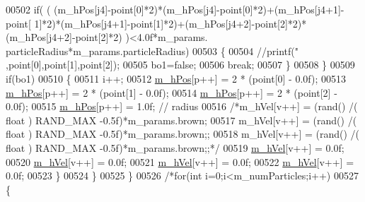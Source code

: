 \begin{DoxyCode}
{{{{{{00502                             \textcolor{keywordflow}{if}( ( (m\_hPos[j4]-point[0]*2)*(m\_hPos[j4]-point[0]*2)+(m\_hPos[j4+1]-point[
      1]*2)*(m\_hPos[j4+1]-point[1]*2)+(m\_hPos[j4+2]-point[2]*2)*(m\_hPos[j4+2]-point[2]*2) )<4.0f*m\_params.
      particleRadius*m\_params.particleRadius)
00503                             \{
00504                                                                 \textcolor{comment}{//printf("%
       ,point[0],point[1],point[2]);}
00505                                 bo1=\textcolor{keyword}{false};
00506                                 \textcolor{keywordflow}{break};
00507                             \}
00508                         \}
00509                         \textcolor{keywordflow}{if}(bo1)
00510                                                 \{
00511                         i++;
00512                         \hyperlink{class_particle_system_ab9d75471d2eaaeb8fa98d2f3f47d9c25}{m\_hPos}[p++] = 2 * (point[0] - 0.0f);
00513                         \hyperlink{class_particle_system_ab9d75471d2eaaeb8fa98d2f3f47d9c25}{m\_hPos}[p++] = 2 * (point[1] - 0.0f);
00514                         \hyperlink{class_particle_system_ab9d75471d2eaaeb8fa98d2f3f47d9c25}{m\_hPos}[p++] = 2 * (point[2] - 0.0f);
00515                         \hyperlink{class_particle_system_ab9d75471d2eaaeb8fa98d2f3f47d9c25}{m\_hPos}[p++] = 1.0f; \textcolor{comment}{// radius}
00516                         \textcolor{comment}{/*m\_hVel[v++] = (rand() /( float ) RAND\_MAX -0.5f)*m\_params.brown;}
00517 \textcolor{comment}{                        m\_hVel[v++] = (rand() /( float ) RAND\_MAX -0.5f)*m\_params.brown;;}
00518 \textcolor{comment}{                        m\_hVel[v++] = (rand() /( float ) RAND\_MAX -0.5f)*m\_params.brown;;*/}
00519                                                 \hyperlink{class_particle_system_a20560c896ee8a8bbc827a8e5902da7e2}{m\_hVel}[v++] = 0.0f;
00520                                                 \hyperlink{class_particle_system_a20560c896ee8a8bbc827a8e5902da7e2}{m\_hVel}[v++] = 0.0f;
00521                                                 \hyperlink{class_particle_system_a20560c896ee8a8bbc827a8e5902da7e2}{m\_hVel}[v++] = 0.0f;
00522                         \hyperlink{class_particle_system_a20560c896ee8a8bbc827a8e5902da7e2}{m\_hVel}[v++] = 0.0f;
00523                                                 \}
00524                     \}
00525                 \}
00526                                 \textcolor{comment}{/*for(int i=0;i<m\_numParticles;i++)}
00527 \textcolor{comment}{                                \{}
}}}}}}
\end{DoxyCode}
